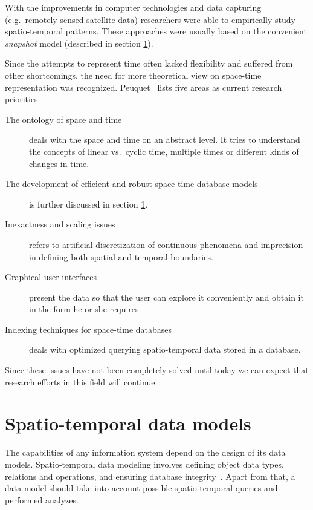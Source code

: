 \documentclass[a4paper,12pt,oneside]{book}
\begin{document}
With the improvements in computer technologies and data capturing
(e.g.\ remotely sensed satellite data) researchers were able to empirically
study spatio-temporal patterns. These approaches were usually based on the
convenient \emph{snapshot} model (described in section \ref{sec:stModels}).

Since the attempts to represent time often lacked flexibility and suffered from other shortcomings,
the need for more theoretical view on space-time representation was recognized.
Peuquet~\cite{peuquet2001} lists five areas as current research priorities:
    \begin{description}
      \item[The ontology of space and time]
      deals with the space and time on an abstract level. It tries to understand
      the concepts of linear vs.\ cyclic time, multiple times or different kinds of changes in time.
      
      \item[The development of efficient and robust space-time database models]
      is \newline further discussed in section \ref{sec:stModels}.
      \item[Inexactness and scaling issues] refers to artificial discretization
      of continuous phenomena and imprecision in defining both spatial and temporal boundaries.
      \item[Graphical user interfaces]
      present the data so that the user can explore it conveniently and obtain it in the form he or she requires.
      \item[Indexing techniques for space-time databases] deals with optimized
      querying spatio-temporal data stored in a database.
     \end{description}

Since these issues have not been completely solved until today we can expect that research efforts
in this field will continue.

\section{Spatio-temporal data models}
\label{sec:stModels}
The capabilities of any information system depend on the design of its data models.
Spatio-temporal data modeling involves defining object data types,
relations and operations, and ensuring database integrity~\cite{pelekis2004}.
Apart from that, a data model should take into account possible spatio-temporal queries and performed analyzes.
\end{document}
